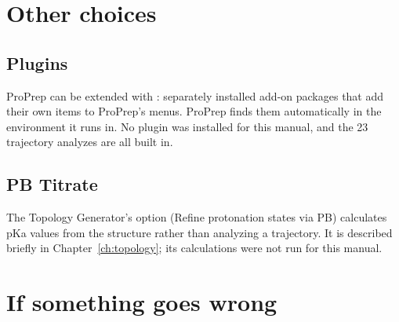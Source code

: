 \section{Other choices}

\subsection{Plugins}

ProPrep can be extended with : separately installed add-on
packages that add their own items to ProPrep's menus. ProPrep finds them
automatically in the environment it runs in. No plugin was installed for this
manual, and the 23 trajectory analyzes are all built in.

\subsection{PB Titrate}

The Topology Generator's option  (Refine protonation states via PB)
calculates pKa values from the structure rather than analyzing a trajectory.
It is described briefly in Chapter~\ref{ch:topology}; its calculations were
not run for this manual.

\section{If something goes wrong}\label{sec:analysis-problems}

